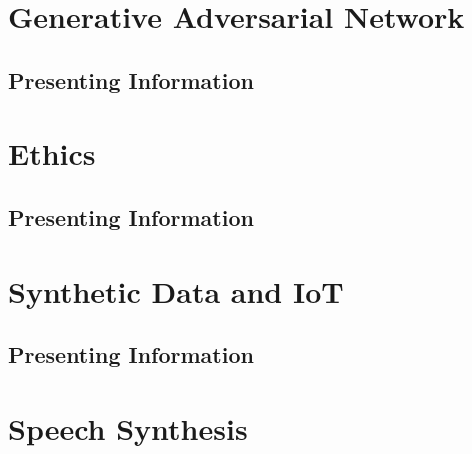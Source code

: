 \documentclass[11pt,fleqn]{book} %
\begin{document}
\part{Generative Adversarial Network}


\chapter{Presenting Information}

%


\part{Ethics}


\chapter{Presenting Information}

%


\part{Synthetic Data and IoT}


\chapter{Presenting Information}

%


\part{Speech Synthesis}
\end{document}
